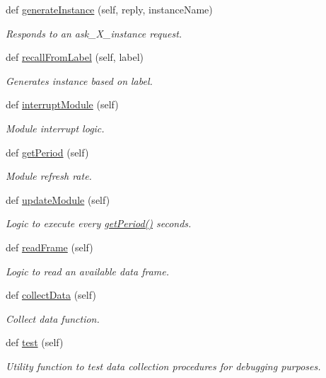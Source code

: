 \begin{DoxyCompactItemize}
def \hyperlink{group__icubclient__SAM__Core_ab5347106cc5a047fb54e41cd2488df88}{generate\+Instance} (self, reply, instance\+Name)
\begin{DoxyCompactList}\small\item\em Responds to an ask\+\_\+\+X\+\_\+instance request. \end{DoxyCompactList}\item 
def \hyperlink{group__icubclient__SAM__Core_a520238102076c1921ed1ca4a27942035}{recall\+From\+Label} (self, label)
\begin{DoxyCompactList}\small\item\em Generates instance based on label. \end{DoxyCompactList}\item 
def \hyperlink{group__icubclient__SAM__Core_a7639f827f67e7831daaa02fedb67b98b}{interrupt\+Module} (self)
\begin{DoxyCompactList}\small\item\em Module interrupt logic. \end{DoxyCompactList}\item 
def \hyperlink{group__icubclient__SAM__Core_a82dd0a034854d247905f2fae4088ad2c}{get\+Period} (self)
\begin{DoxyCompactList}\small\item\em Module refresh rate. \end{DoxyCompactList}\item 
def \hyperlink{group__icubclient__SAM__Core_a5762ec3d1b75e0f9ad561eab86018512}{update\+Module} (self)
\begin{DoxyCompactList}\small\item\em Logic to execute every \hyperlink{group__icubclient__SAM__Core_a82dd0a034854d247905f2fae4088ad2c}{get\+Period()} seconds. \end{DoxyCompactList}\item 
def \hyperlink{group__icubclient__SAM__Core_ac61db7ca04e5e86639c0413b14421c64}{read\+Frame} (self)
\begin{DoxyCompactList}\small\item\em Logic to read an available data frame. \end{DoxyCompactList}\item 
def \hyperlink{group__icubclient__SAM__Core_a46552835c6838d63ab48803180c4a6ec}{collect\+Data} (self)
\begin{DoxyCompactList}\small\item\em Collect data function. \end{DoxyCompactList}\item 
def \hyperlink{group__icubclient__SAM__Core_aa72f478cad3de6494731fa172c5a3105}{test} (self)
\begin{DoxyCompactList}\small\item\em Utility function to test data collection procedures for debugging purposes. \end{DoxyCompactList}\end{DoxyCompactItemize}
